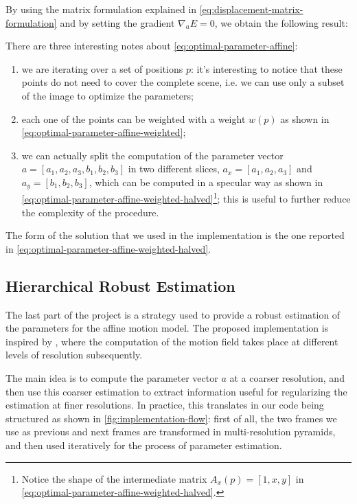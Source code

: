By using the matrix formulation explained in \cref{eq:displacement-matrix-formulation} and by setting the gradient $\nabla_a E = 0$, we obtain the following result:

There are three interesting notes about \cref{eq:optimal-parameter-affine}:
\begin{enumerate}
    \item we are iterating over a set of positions $p$: it's interesting to notice that these points do not need to cover the complete scene, i.e. we can use only a subset of the image to optimize the parameters;
    \item each one of the points can be weighted with a weight $w(p)$ as shown in \cref{eq:optimal-parameter-affine-weighted};
    \item we can actually split the computation of the parameter vector $a = [a_1, a_2, a_3, b_1, b_2, b_3]$ in two different slices, $a_x = [a_1, a_2, a_3]$ and $a_y = [b_1, b_2, b_3]$, which can be computed in a specular way as shown in \cref{eq:optimal-parameter-affine-weighted-halved}\footnote{Notice the shape of the intermediate matrix $A_x(p) = [1,x,y]$ in \cref{eq:optimal-parameter-affine-weighted-halved}.}; this is useful to further reduce the complexity of the procedure.
\end{enumerate} 



The form of the solution that we used in the implementation is the one reported in \cref{eq:optimal-parameter-affine-weighted-halved}.

\subsection{Hierarchical Robust Estimation}

The last part of the project is a strategy used to provide a robust estimation of the parameters for the affine motion model.
The proposed implementation is inspired by \cite{Dufeaux2000}, where the computation of the motion field takes place at different levels of resolution subsequently.

The main idea is to compute the parameter vector $a$ at a coarser resolution, and then use this coarser estimation to extract information useful for regularizing the estimation at finer resolutions. 
In practice, this translates in our code being structured as shown in \cref{fig:implementation-flow}: first of all, the two frames we use as previous and next frames are transformed in multi-resolution pyramids, and then used iteratively for the process of parameter estimation.

